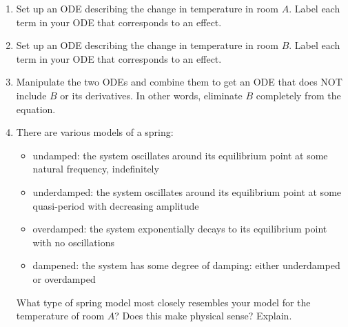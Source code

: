 \begin{enumerate}
\begin{enumerate}
	\item Set up an ODE describing the change in temperature in room $A$.
     Label each term in your ODE that corresponds to an effect.
    \item Set up an ODE describing the change in temperature in room $B$.
     Label each term in your ODE that corresponds to an effect.
    \item Manipulate the two ODEs and combine them to get an ODE that does NOT include $B$ or its derivatives. In other words, eliminate $B$ completely from the equation.

    \item There are various models of a spring:
    \begin{itemize}
        \item undamped: the system oscillates around its equilibrium point at some natural frequency, indefinitely
        \item underdamped: the system oscillates around its equilibrium point at some quasi-period with decreasing amplitude
        \item overdamped: the system exponentially decays to its equilibrium point with no oscillations
        \item dampened: the system has some degree of damping: either underdamped or overdamped
    \end{itemize}
    
    What type of spring model most closely resembles your model for the temperature of room $A$? Does this make physical sense? Explain.
    
\end{enumerate}



\end{enumerate}